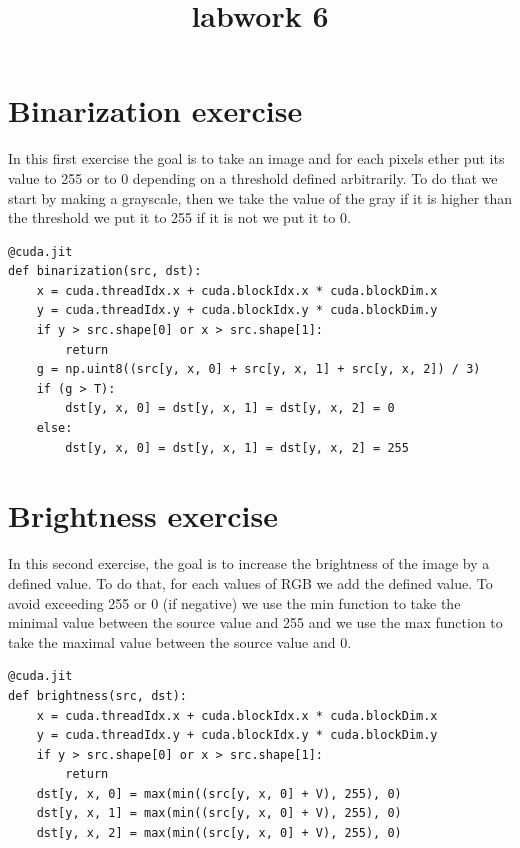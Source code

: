\documentclass{report}
\begin{document}
\title{labwork 6}
\maketitle

\section{Binarization exercise}
In this first exercise the goal is to take an image and for each pixels ether put its value to 255 or to 0 depending on a threshold defined arbitrarily. 
\newline
To do that we start by making a grayscale, then we take the value of the gray if it is higher than the threshold we put it to 255 if it is not we put it to 0.
\begin{lstlisting}
@cuda.jit
def binarization(src, dst):
    x = cuda.threadIdx.x + cuda.blockIdx.x * cuda.blockDim.x
    y = cuda.threadIdx.y + cuda.blockIdx.y * cuda.blockDim.y
    if y > src.shape[0] or x > src.shape[1]:
        return
    g = np.uint8((src[y, x, 0] + src[y, x, 1] + src[y, x, 2]) / 3)
    if (g > T):
        dst[y, x, 0] = dst[y, x, 1] = dst[y, x, 2] = 0
    else:
        dst[y, x, 0] = dst[y, x, 1] = dst[y, x, 2] = 255
\end{lstlisting}
\section{Brightness exercise}
In this second exercise, the goal is to increase the brightness of the image by a defined value.
\newline
To do that, for each values of RGB we add the defined value. To avoid exceeding 255 or 0 (if negative) we use the min function to take the minimal value between the source value and 255 and we use the max function to take the maximal value between the source value and 0.
\begin{lstlisting}
@cuda.jit
def brightness(src, dst):
    x = cuda.threadIdx.x + cuda.blockIdx.x * cuda.blockDim.x
    y = cuda.threadIdx.y + cuda.blockIdx.y * cuda.blockDim.y
    if y > src.shape[0] or x > src.shape[1]:
        return
    dst[y, x, 0] = max(min((src[y, x, 0] + V), 255), 0)
    dst[y, x, 1] = max(min((src[y, x, 0] + V), 255), 0)
    dst[y, x, 2] = max(min((src[y, x, 0] + V), 255), 0)
\end{lstlisting}
\newpage
\end{document}
